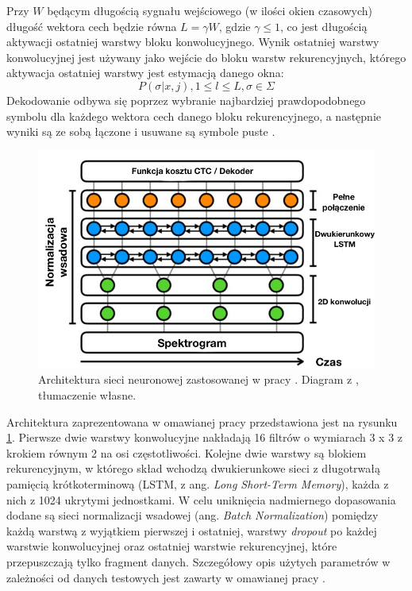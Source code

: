 \documentclass[12pt,a4paper,twoside]{mwart}
\begin{document}
Przy $W$ będącym długością sygnału wejściowego (w ilości okien czasowych) długość wektora cech będzie równa $L = \gamma W$, gdzie $\gamma \leqslant 1$, co jest długością aktywacji ostatniej warstwy bloku konwolucyjnego. Wynik ostatniej warstwy konwolucyjnej jest używany jako wejście do bloku warstw rekurencyjnych, którego aktywacja ostatniej warstwy jest estymacją danego okna:
\begin{equation}
  P(\sigma | x, j), 1 \leqslant l \leqslant L, \sigma \in \Sigma 
\end{equation}
Dekodowanie odbywa się poprzez wybranie najbardziej prawdopodobnego symbolu dla każdego wektora cech danego bloku rekurencyjnego, a następnie wyniki są ze sobą łączone i usuwane są symbole puste 
\cite[2-5]{Transcription:Pertus:NeuralNetwork}
.


\begin{figure}[ht]
  \begin{center}
    \includegraphics[scale=0.5]{images/holisticNetworkArchitecture.jpg}
    \caption{Architektura sieci neuronowej zastosowanej w pracy  \cite{Transcription:Pertus:NeuralNetwork}. Diagram z 
    \cite[5]{Transcription:Pertus:NeuralNetwork}
    , tłumaczenie własne.}
    \label{fig:holisticNetworkArchitecture}
  \end{center}
\end{figure}

Architektura zaprezentowana w omawianej pracy przedstawiona jest na rysunku \ref{fig:holisticNetworkArchitecture}. Pierwsze dwie warstwy konwolucyjne nakładają 16 filtrów o wymiarach 3 x 3 z krokiem równym 2 na osi częstotliwości. Kolejne dwie warstwy są blokiem rekurencyjnym, w którego skład wchodzą dwukierunkowe sieci z długotrwałą pamięcią krótkoterminową (LSTM, z ang. \textit{Long Short-Term Memory}), każda z nich z 1024 ukrytymi jednostkami. W celu uniknięcia nadmiernego dopasowania dodane są sieci normalizacji wsadowej (ang. \textit{Batch Normalization}) pomiędzy każdą warstwą z wyjątkiem pierwszej i ostatniej, warstwy \textit{dropout} po każdej warstwie konwolucyjnej oraz ostatniej warstwie rekurencyjnej, które przepuszczają tylko fragment danych. Szczegółowy opis użytych parametrów w zależności od danych testowych jest zawarty w omawianej pracy \cite{Transcription:Pertus:NeuralNetwork}.
\end{document}
